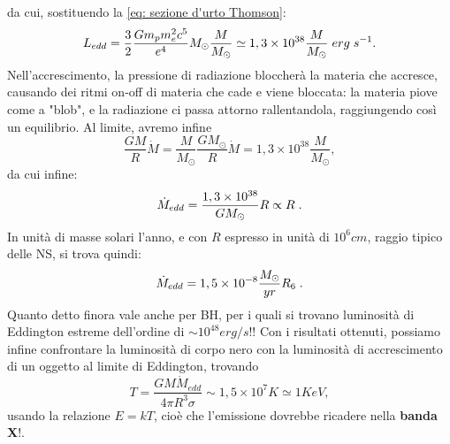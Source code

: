 da cui, sostituendo la \eqref{eq: sezione d'urto Thomson}:
\begin{equation}
    L_{edd}=\frac{3}{2}\frac{Gm_pm_e^2c^5}{e^4}M_{\odot}\frac{M}{M_{\odot}}\simeq 1,3\times10^{38}\frac{M}{M_{\odot}}\hspace{1mm}erg\hspace{1mm}s^{-1}.
\end{equation}
Nell'accrescimento, la pressione di radiazione bloccherà la materia che accresce, causando dei ritmi on-off di materia che cade e viene bloccata:
la materia piove come a "blob", e la radiazione ci passa attorno rallentandola, raggiungendo così un equilibrio.
Al limite, avremo infine
\begin{equation}
    \frac{GM}{R}\dot{M}=\frac{M}{M_{\odot}}\frac{GM_{\odot}}{R}\dot{M}=1,3\times10^{38}\frac{M}{M_{\odot}},
\end{equation}
da cui infine:
\begin{equation}
    \dot{M}_{edd} = \frac{1,3\times10^{38}}{GM_{\odot}}R \propto R\hspace{1mm}.
\end{equation}
In unità di masse solari l'anno, e con $R$ espresso in unità di $10^6cm$, raggio tipico delle NS, si trova quindi:
\begin{equation}
    \dot{M}_{edd}=1,5\times10^{-8}\frac{M_{\odot}}{yr}R_6\hspace{1mm}.
\end{equation}
Quanto detto finora vale anche per BH, per i quali si trovano luminosità di Eddington estreme dell'ordine di $\sim10^{48}erg/s $!!
Con i risultati ottenuti, possiamo infine confrontare la luminosità di corpo nero con la luminosità di accrescimento di un oggetto al limite di Eddington, trovando
\begin{equation}
    T=\frac{GM\dot{M}_{edd}}{4\pi R^3\sigma}\sim 1,5\times 10^{7}K\simeq 1KeV,
\end{equation}
usando la relazione $E=kT$, cioè che l'emissione dovrebbe ricadere nella \textbf{banda X}!.

